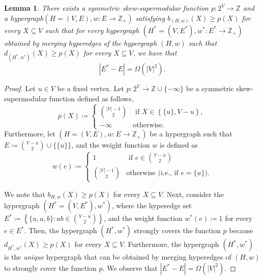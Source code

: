 \documentclass{article}
\newtheorem{lemma}{Lemma}[section]
\providecommand{\Z}{\mathbb{Z}}
\begin{document}
\begin{lemma}
There exists a symmetric skew-supermodular function  $p:2^V\rightarrow\Z$ and a hypergraph\linebreak $\left(H = (V, E), w:E \rightarrow\Z_+\right)$ satisfying $b_{(H, w)}(X) \geq p(X)$ for every $X \subseteq V$ such that for every hypergraph $\left(H^* = (V, E^*), w^*:E^* \rightarrow\Z_+\right)$ obtained by merging hyperedges of the hypergraph $(H, w)$ such that $d_{(H^*, w^*)}(X) \geq p(X)$ for every $X\subseteq V$, we have that 
\[
|E^*-E|=\Omega(|V|^2). 
\]
\end{lemma}
\begin{proof}
Let $u\in V$ be a fixed vertex. Let $p:2^V\rightarrow\Z\cup\{-\infty\}$ be a symmetric skew-supermodular function defined as follows,
$$p(X) \coloneqq  \begin{cases}
    {\binom{|V| - 1}{2}}& \text{ if } X \in \left\{\{u\}, V - u\right\},\\
    - \infty &\text{otherwise.}
\end{cases}$$
Furthermore, let $(H = (V, E), w:E\rightarrow\Z_+)$ be a hypergraph such that $E \coloneqq  {\binom{V - u}{2}}\cup \{\{u\}\}$, and the weight function $w$ is defined as
$$w(e) \coloneqq  \begin{cases}
    1& \text{ if } e \in {\binom{V - u}{2}}\\
    {\binom{|V| - 1}{2}}& \text{otherwise (i.e., if $e = \{u\}$)}.
\end{cases}$$

We note that $b_{H, w}(X) \geq p(X)$ for every $X \subseteq V$. Next, consider the hypergraph $(H^* = (V, E^*), w^*)$, where the hyperedge set $E^* \coloneqq  \left\{\{u, a, b\} : ab \in {\binom{V-u}{2}}\right\}$, and the weight function $w^*(e) \coloneqq  1$ for every $e \in E^*$. Then, the hypergraph $(H^*, w^*)$ strongly covers the function $p$ because $d_{H^*, w^*}(X) \geq p(X)$ for every $X \subseteq V$. Furthermore, the hypergraph $(H^*, w^*)$ is the \emph{unique} hypergraph that can be obtained by merging hyperedges of $(H, w)$ to strongly cover the function $p$. We observe that $|E^*-E| = \Omega(|V|^2)$. 
\end{proof}
\end{document}
